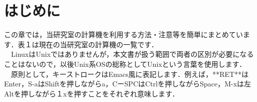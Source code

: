 \documentclass[main]{subfiles}
\begin{document}
\chapter{はじめに}
\fontsize{10}{10} \selectfont
この章では，当研究室の計算機を利用する方法・注意等を簡単にまとめています．表１は現在の当研究室の計算機の一覧です．\\
　LinuxはUnixではありませんが，本文書が扱う範囲で両者の区別が必要になることはないので，以後Unix系OSの総称としてUnixという言葉を使用します．\\
　原則として，キーストロークはEmacs風に表記します．例えば，**RET**はEnter，S-aはShiftを押しながらa，CーSPCはCtrlを押しながらSpace，M-xは左Altを押しながら１xを押すことをそれぞれ意味します．
\end{document}
